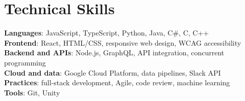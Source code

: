\documentclass[letterpaper,11pt]{article}
\begin{document}
\section{Technical Skills}
 \begin{itemize}[leftmargin=0.15in, label={}]
    \small{\item{
     \textbf{Languages}{: JavaScript, TypeScript, Python, Java, C\#, C, C++} \\
     \textbf{Frontend}{: React, HTML/CSS, responsive web design, WCAG accessibility} \\
     \textbf{Backend and APIs}{: Node.js, GraphQL, API integration, concurrent programming} \\
     \textbf{Cloud and data}{: Google Cloud Platform, data pipelines, Slack API} \\
     \textbf{Practices}{: full-stack development, Agile, code review, machine learning} \\
     \textbf{Tools}{: Git, Unity}
    }}
 \end{itemize}
\end{document}
